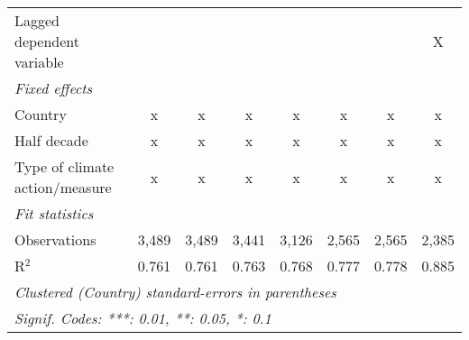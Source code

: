 \begin{tabular}{lccccccc}
   Lagged dependent variable                                   &              &              &              &         &         &         & X\\  
   \emph{Fixed effects}\\
   Country                                                     & x            & x            & x            & x       & x       & x       & x\\  
   Half decade                                                 & x            & x            & x            & x       & x       & x       & x\\  
   Type of climate action/measure                              & x            & x            & x            & x       & x       & x       & x\\  
   \midrule \emph{Fit statistics}\\
   Observations                                                & 3,489        & 3,489        & 3,441        & 3,126   & 2,565   & 2,565   & 2,385\\  
   R$^2$                                                       & 0.761        & 0.761        & 0.763        & 0.768   & 0.777   & 0.778   & 0.885\\  
   \midrule
   \multicolumn{8}{l}{\emph{Clustered (Country) standard-errors in parentheses}}\\
   \multicolumn{8}{l}{\emph{Signif. Codes: ***: 0.01, **: 0.05, *: 0.1}}\\
\end{tabular}
\par\endgroup


